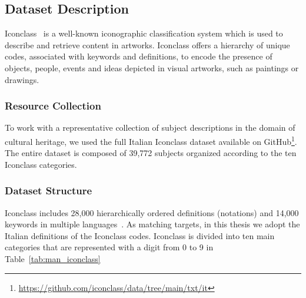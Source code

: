 \documentclass[epsfig,a4paper,12pt,titlepage]{book}
\begin{document}
\subsection{Dataset Description}
\label{dataset_coherence}
\label{sec:iconclass}
Iconclass~\cite{couprie1983iconclass} is a well-known iconographic classification system which is used to describe and retrieve content in artworks. Iconclass offers a hierarchy of unique codes, associated with keywords and definitions, to encode the presence of objects, people, events and ideas depicted in visual artworks, such as paintings or drawings. 
\subsubsection{Resource Collection}
To work with a representative collection of subject descriptions in the domain of cultural heritage, we used the full Italian Iconclass dataset available on GitHub\footnote{\url{https://github.com/iconclass/data/tree/main/txt/it}}. The entire dataset is composed of 39,772 subjects organized according to the ten Iconclass categories.
\subsubsection{Dataset Structure}
Iconclass includes 28,000 hierarchically ordered definitions (notations) and 14,000 keywords in multiple languages~\cite{kabashi2019iconclass}. As matching targets, in this thesis we adopt the Italian
definitions of the Iconclass codes. Iconclass is divided into ten main categories that are represented with a digit from 0 to 9 in Table~\ref{tab:man_iconclass} 
\end{document}
